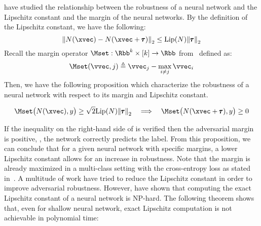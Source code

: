 \citet{tsuzuku2018lipschitz} have studied the relationship between the robustness of a neural network and the Lipschitz constant and the margin of the neural networks. 
By the definition of the Lipschitz constant, we have the following:
\begin{equation}
  \norm{N(\xvec) - N(\xvec + \adv)}_2 \leq \lip{N} \norm{\adv}_2
\end{equation}
Recall the margin operator $\Mset: \Rbb^k \times [k] \rightarrow \Rbb$ from~ defined as:
\begin{equation}
  \Mset(\vvec, j) \triangleq \vvec_j - \max_{i \neq j} \vvec_i
\end{equation}
Then, we have the following proposition which characterize the robustness of a neural network with respect to its margin and Lipschitz constant.
\begin{proposition}
  \begin{equation} \label{equation:ch3-margin_guarded_area}
    \Mset \big( N(\xvec), y \big) \geq \sqrt{2} \lip{N} \norm{\adv}_2 \quad \Longrightarrow \quad \Mset \big( N(\xvec + \adv), y \big) \geq 0
  \end{equation}
  \removespace
\end{proposition}
\noindent
If the inequality on the right-hand side of  is verified then the adversarial margin is positive, \ie, the network correctly predicts the label. 
From this proposition, we can conclude that for a given neural network with specific margins, a lower Lipschitz constant allows for an increase in robustness. 
Note that the margin is already maximized in a multi-class setting with the cross-entropy loss as stated in~\citet{hein2017formal}.
A multitude of work have tried to reduce the Lipschitz constant in order to improve adversarial robustness.
However, \citet{scaman2018lipschitz} have shown that computing the exact Lipschitz constant of a neural network is NP-hard.
The following theorem shows that, even for shallow neural network, exact Lipschitz computation is not achievable in polynomial time:

